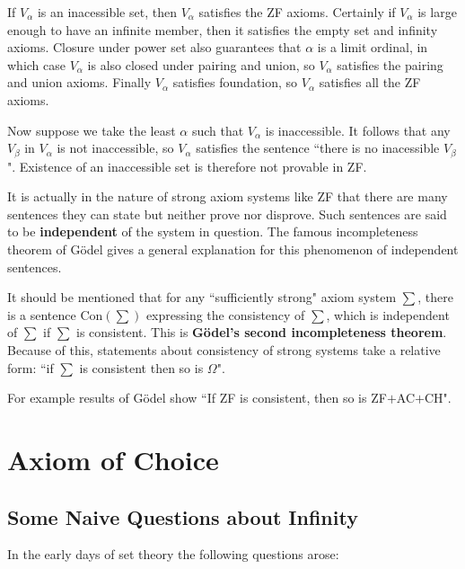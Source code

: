 \documentclass[12pt, a4paper, oneside, openright, titlepage]{book}
\begin{document}
If $V_{\alpha}$ is an inacessible set, then $V_{\alpha}$ satisfies the ZF axioms. Certainly if $V_{\alpha}$ is large enough to have an infinite member, then it satisfies the empty set and infinity axioms. Closure under power set also guarantees that $\alpha$ is a limit ordinal, in which case $V_{\alpha}$ is also closed under pairing and union, so $V_{\alpha}$ satisfies the pairing and union axioms. Finally $V_{\alpha}$ satisfies foundation, so $V_{\alpha}$ satisfies all the ZF axioms.

Now suppose we take the least $\alpha$ such that $V_{\alpha}$ is inaccessible. It follows that any $V_{\beta}$ in $V_{\alpha}$ is not inaccessible, so $V_{\alpha}$ satisfies the sentence ``there is no inacessible $V_{\beta}$". Existence of an inaccessible set is therefore not provable in ZF.

It is actually in the nature of strong axiom systems like ZF that there are many sentences they can state but neither prove nor disprove. Such sentences are said to be \textbf{independent} of the system in question. The famous incompleteness theorem of G\"{o}del gives a general explanation for this phenomenon of independent sentences.

It should be mentioned that for any ``sufficiently strong" axiom system $\sum$, there is a sentence $\text{Con}(\sum)$ expressing the consistency of $\sum$, which is independent of $\sum$ if $\sum$ is consistent. This is \textbf{G\"{o}del's second incompleteness theorem}. Because of this, statements about consistency of strong systems take a relative form: ``if $\sum$ is consistent then so is $\Omega$".

For example results of G\"{o}del show ``If ZF is consistent, then so is ZF$+$AC$+$CH". 






\chapter{Axiom of Choice}


\section{Some Naive Questions about Infinity}

In the early days of set theory the following questions arose:
\end{document}
